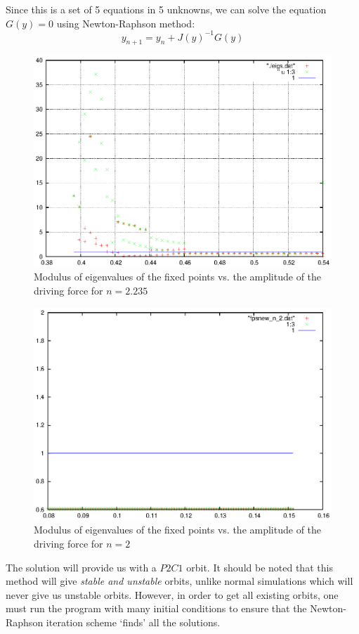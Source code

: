 \documentclass{book}
\renewcommand{\(}{\begin{columns}}
\renewcommand{\)}{\end{columns}}
\newcommand{\<}[1]{\begin{column}{#1}}
\renewcommand{\>}{\end{column}}
\begin{document}
Since this is a set of 5 equations in 5 unknowns, we can solve the equation $G(y)=0$ using Newton-Raphson method:
\[
y_{n+1}=y_n+J(y)^{-1}G(y)
\]


\begin{figure}[!htp]
\caption{Modulus of  eigenvalues of the fixed points vs. the amplitude of the driving 
force for $n=2.235$}
\label{fig-eig-F-crude}
\begin{center}
\includegraphics[width=0.7\columnwidth]{eigvals}
\end{center}
\end{figure}

\begin{figure}[!htp]
\caption{Modulus of eigenvalues of the fixed points vs. the amplitude of the driving 
force for $n=2$}
\label{fig-eig-F-n2-crude}
\begin{center}
\includegraphics[width=0.7\columnwidth]{eigvals_n2}
\end{center}
\end{figure}

The solution will provide us with a $P2C1$ orbit.  It should be noted that 
this method will give \emph{stable and unstable} orbits, unlike normal 
simulations which will never give us unstable orbits.  However, in order to 
get all existing orbits, one must run the program with many initial conditions 
to ensure that the Newton-Raphson iteration scheme `finds' all the solutions.  
\end{document}
